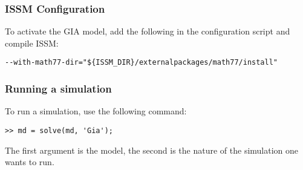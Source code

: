 \subsubsection{ISSM Configuration}
To activate the GIA model, add the following in the configuration script and compile ISSM:
\begin{lstlisting}
--with-math77-dir="${ISSM_DIR}/externalpackages/math77/install"
\end{lstlisting}

\subsubsection{Running a simulation}
To run a simulation, use the following command:
\begin{lstlisting}
>> md = solve(md, 'Gia');
\end{lstlisting}
The first argument is the model, the second is the nature of the simulation one wants to run.

\clearpage %
